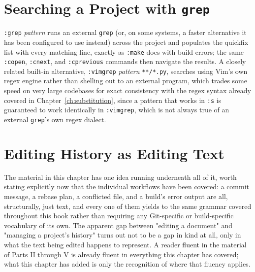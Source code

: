 \section{Searching a Project with \texttt{grep}}

\texttt{:grep} \textit{pattern} runs an external \texttt{grep} (or, on some systems, a faster alternative it has been configured to use instead) across the project and populates the quickfix list with every matching line, exactly as \texttt{:make} does with build errors; the same \texttt{:copen}, \texttt{:cnext}, and \texttt{:cprevious} commands then navigate the results. A closely related built-in alternative, \texttt{:vimgrep} \textit{pattern} \texttt{**/*.py}, searches using Vim's own regex engine rather than shelling out to an external program, which trades some speed on very large codebases for exact consistency with the regex syntax already covered in Chapter~\ref{ch:substitution}, since a pattern that works in \texttt{:s} is guaranteed to work identically in \texttt{:vimgrep}, which is not always true of an external \texttt{grep}'s own regex dialect.

\section{Editing History as Editing Text}

The material in this chapter has one idea running underneath all of it, worth stating explicitly now that the individual workflows have been covered: a commit message, a rebase plan, a conflicted file, and a build's error output are all, structurally, just text, and every one of them yields to the same grammar covered throughout this book rather than requiring any Git-specific or build-specific vocabulary of its own. The apparent gap between "editing a document" and "managing a project's history" turns out not to be a gap in kind at all, only in what the text being edited happens to represent. A reader fluent in the material of Parts II through V is already fluent in everything this chapter has covered; what this chapter has added is only the recognition of where that fluency applies.
